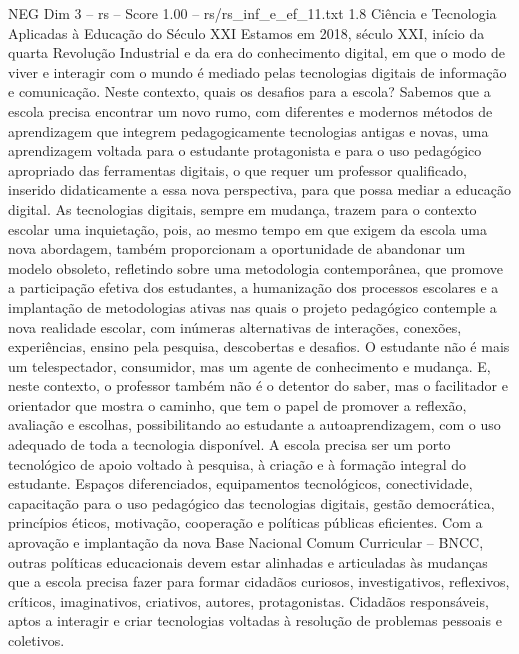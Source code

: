 \begin{textsample}{NEG Dim 3 – rs – Score 1.00 – rs/rs\_inf\_e\_ef\_11.txt}  \label{ex:f3_neg_044}
1.8 Ciência e Tecnologia Aplicadas à Educação do Século XXI Estamos em 2018, século XXI, início da quarta Revolução Industrial e da era do conhecimento digital, em que o modo de viver e interagir com o mundo é mediado pelas tecnologias digitais de informação e comunicação.
Neste contexto, quais os desafios para a escola?
Sabemos que a escola precisa encontrar um novo rumo, com diferentes e modernos métodos de aprendizagem que integrem pedagogicamente tecnologias antigas e novas, uma aprendizagem voltada para o estudante protagonista e para o uso pedagógico apropriado das ferramentas digitais, o que requer um professor qualificado, inserido didaticamente a essa nova perspectiva, para que possa mediar a educação digital.
As tecnologias digitais, sempre em mudança, trazem para o contexto escolar uma inquietação, pois, ao mesmo tempo em que exigem da escola uma nova abordagem, também proporcionam a oportunidade de abandonar um modelo obsoleto, refletindo sobre uma metodologia contemporânea, que promove a participação efetiva dos estudantes, a humanização dos processos escolares e a implantação de metodologias ativas nas quais o projeto pedagógico contemple a nova realidade escolar, com inúmeras alternativas de interações, conexões, experiências, ensino pela pesquisa, descobertas e desafios.
O estudante não é mais um telespectador, consumidor, mas um agente de conhecimento e mudança.
E, neste contexto, o professor também não é o detentor do saber, mas o facilitador e orientador que mostra o caminho, que tem o papel de promover a reflexão, avaliação e escolhas, possibilitando ao estudante a autoaprendizagem, com o uso adequado de toda a tecnologia disponível.
A escola precisa ser um porto tecnológico de apoio voltado à pesquisa, à criação e à formação integral do estudante.
Espaços diferenciados, equipamentos tecnológicos, conectividade, capacitação para o uso pedagógico das tecnologias digitais, gestão democrática, princípios éticos, motivação, cooperação e políticas públicas eficientes.
Com a aprovação e implantação da nova Base Nacional Comum Curricular – BNCC, outras políticas educacionais devem estar alinhadas e articuladas às mudanças que a escola precisa fazer para formar cidadãos curiosos, investigativos, reflexivos, críticos, imaginativos, criativos, autores, protagonistas.
Cidadãos responsáveis, aptos a interagir e criar tecnologias voltadas à resolução de problemas pessoais e coletivos.

\end{textsample}
